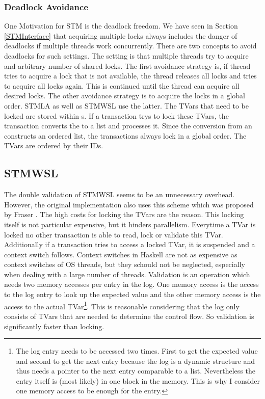 \subsubsection{Deadlock Avoidance}
One Motivation for STM is the deadlock freedom. We have seen in Section \ref{STMInterface} that acquiring 
multiple locks always includes the danger of deadlocks if multiple threads work concurrently. 
There are two concepts to avoid deadlocks for such settings. The setting is that multiple threads
try to acquire and arbitrary number of shared locks. The first avoidance strategy is, if thread tries to 
acquire a lock that is not available, the thread releases all locks and tries to acquire all locks again.
This is continued until the thread can acquire all desired locks. The other avoidance strategy is to 
acquire the locks in a global order. STMLA as well as STMWSL use the latter. The TVars that need to be 
locked are stored within s. If a transaction trys to lock these TVars, the transaction converts 
the  to a list and processes it. Since the conversion from an  constructs an ordered 
list, the transactions always lock in a global order. The TVars are ordered by their IDs.


\subsection{STMWSL}
The double validation of STMWSL seems to be an unnecessary overhead. However, the original implementation 
also uses this scheme which was proposed by Fraser \parencite[Page 42]{lockfreedom}. The high costs for locking the TVars
are the reason. This locking itself is not particular expensive, but it hinders parallelism.
Everytime a TVar is locked no other transaction is able to read, lock or validate this TVar. Additionally if 
a transaction tries to access a locked TVar, it is suspended and a context switch follows. Context switches in Haskell 
are not as expensive as context switches of OS threads, but they schould not be neglected, especially when dealing
with a large number of threads. Validation is an operation which needs two memory accesses per entry in the log.
One memory access is the access to the log entry to look up the expected value and the other memory access is
the access to the actual TVar\footnote{The log entry needs to be accessed two times. First to get the expected
value and second to get the next entry because the log is a dynamic structure and thus needs a pointer
to the next entry comparable to a list. Nevertheless the entry itself is (most likely) in one block in the memory.
This is why I consider one memory access to be enough for the entry.}. This is reasonable considering that the 
log only consists of TVars that are needed to determine the control flow. So validation is significantly faster
than locking. 


